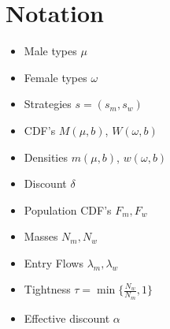 \section{Notation}
\label{appx: c} 
\begin{itemize}
    \item Male types $\mu$
    \item Female types $\omega$
    \item Strategies $s=(s_m,s_w)$
    \item CDF's $M(\mu, b)$, $W(\omega,b)$
    \item Densities $m(\mu, b)$, $w(\omega,b)$
    \item Discount $\delta$ 
    \item Population CDF's $F_m, F_w$
    \item Masses $N_m, N_w$
    \item Entry Flows $\lambda_m, \lambda_w$
    \item Tightness $\tau = \min\{\frac{N_w}{N_m}, 1\}$
    \item Effective discount $\alpha$ 
\end{itemize}